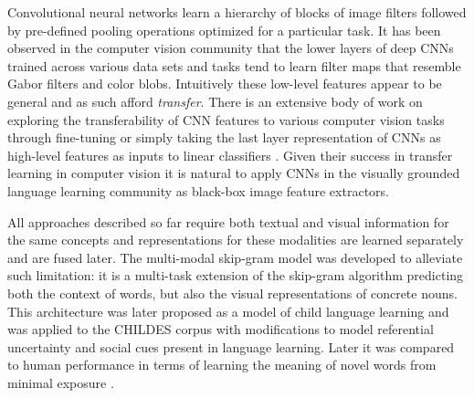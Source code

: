 



Convolutional neural networks learn a hierarchy of blocks of image filters followed by
pre-defined pooling operations optimized for a particular task.
It has been observed in the computer vision community that the lower layers of
deep CNNs trained across various data sets and tasks tend to learn filter maps
that resemble Gabor filters \citep{gabor1946theory} and color blobs. Intuitively these low-level features appear to be general
and as such afford \emph{transfer}. There is an extensive body of work on exploring the transferability
of CNN features to various computer vision tasks through fine-tuning
 \citep{donahue2014decaf,oquab2014learning} or simply taking the last layer representation of CNNs
as high-level features as inputs to linear classifiers \citep{girshick2014rich,sharif2014cnn}.
Given their success in transfer learning in computer vision it is natural to apply CNNs in the
visually grounded language learning community as black-box image feature extractors.




All approaches described so far require both textual and visual information for the same concepts and
representations for these modalities are learned separately and are fused later.
The multi-modal skip-gram \citep{lazaridou2015combining} model was developed to alleviate such limitation:
it is a multi-task extension of the skip-gram algorithm predicting both the context of words, but also
the visual representations of concrete nouns. 
This architecture was later proposed as a model of child language learning and
was applied to the CHILDES corpus \citep{macwhinney2014childes} with modifications to model referential
uncertainty and social cues \cite{lazaridou2016multimodal} present in language learning.
Later it was compared to human performance in terms of learning the meaning of novel words from minimal 
exposure  \citep{lazaridou2017multimodal}.


